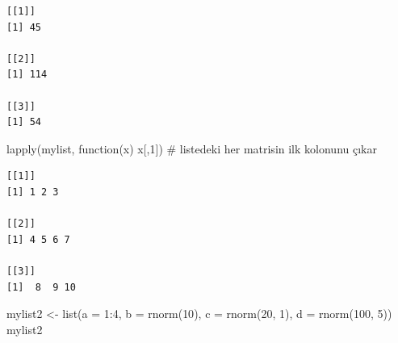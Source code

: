 \documentclass[
  letterpaper,
  DIV=11,
  numbers=noendperiod]{scrreprt}
\newenvironment{Shaded}{\begin{snugshade}}{\end{snugshade}}
\newcommand{\AttributeTok}[1]{\textcolor[rgb]{0.40,0.45,0.13}{#1}}
\newcommand{\CommentTok}[1]{\textcolor[rgb]{0.37,0.37,0.37}{#1}}
\newcommand{\ControlFlowTok}[1]{\textcolor[rgb]{0.00,0.23,0.31}{#1}}
\newcommand{\DecValTok}[1]{\textcolor[rgb]{0.68,0.00,0.00}{#1}}
\newcommand{\FunctionTok}[1]{\textcolor[rgb]{0.28,0.35,0.67}{#1}}
\newcommand{\NormalTok}[1]{\textcolor[rgb]{0.00,0.23,0.31}{#1}}
\newcommand{\OtherTok}[1]{\textcolor[rgb]{0.00,0.23,0.31}{#1}}
\newcommand{\SpecialCharTok}[1]{\textcolor[rgb]{0.37,0.37,0.37}{#1}}
\begin{document}
\begin{verbatim}
[[1]]
[1] 45

[[2]]
[1] 114

[[3]]
[1] 54
\end{verbatim}

\begin{Shaded}
\begin{Highlighting}[]
\FunctionTok{lapply}\NormalTok{(mylist, }\ControlFlowTok{function}\NormalTok{(x) x[,}\DecValTok{1}\NormalTok{]) }\CommentTok{\# listedeki her matrisin ilk kolonunu çıkar}
\end{Highlighting}
\end{Shaded}

\begin{verbatim}
[[1]]
[1] 1 2 3

[[2]]
[1] 4 5 6 7

[[3]]
[1]  8  9 10
\end{verbatim}

\begin{Shaded}
\begin{Highlighting}[]
\NormalTok{mylist2 }\OtherTok{\textless{}{-}} \FunctionTok{list}\NormalTok{(}\AttributeTok{a =} \DecValTok{1}\SpecialCharTok{:}\DecValTok{4}\NormalTok{, }\AttributeTok{b =} \FunctionTok{rnorm}\NormalTok{(}\DecValTok{10}\NormalTok{), }\AttributeTok{c =} \FunctionTok{rnorm}\NormalTok{(}\DecValTok{20}\NormalTok{, }\DecValTok{1}\NormalTok{), }\AttributeTok{d =} \FunctionTok{rnorm}\NormalTok{(}\DecValTok{100}\NormalTok{, }\DecValTok{5}\NormalTok{))}
\NormalTok{mylist2}
\end{Highlighting}
\end{Shaded}
\end{document}
